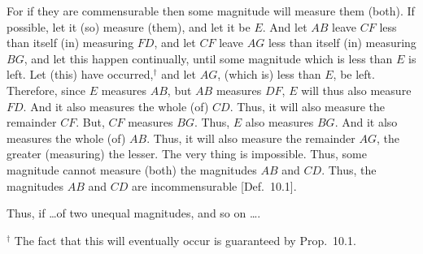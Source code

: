 \begin{Parallel}{}{}
{For if they are commensurable then some magnitude will measure them (both). If possible, let it
(so) measure (them),  and let it be $E$. And let $AB$ leave $CF$
less than itself (in) measuring $FD$, and let $CF$ leave $AG$ less than
itself (in) measuring $BG$, and let this happen continually, until  some magnitude which is less than  $E$ is left. Let (this) have occurred,$^\dag$ and
let $AG$, (which is) less than $E$, be left. Therefore, since
$E$ measures $AB$, but $AB$ measures $DF$, $E$ will thus also measure $FD$. And it also measures the whole (of) $CD$. Thus, it will
also measure the remainder  $CF$. But, $CF$ measures $BG$. Thus,
$E$ also measures $BG$. And it also measures the whole (of) $AB$. 
Thus, it will also measure the remainder $AG$, the greater (measuring)
the lesser. The very thing is impossible. Thus, some magnitude cannot
measure (both) the magnitudes $AB$ and $CD$. Thus, the
magnitudes $AB$ and $CD$ are incommensurable [Def.~10.1].

Thus, if \ldots of two unequal magnitudes, and so on \ldots.}
\end{Parallel}
{\footnotesize\noindent$^\dag$ The fact that this will eventually occur is guaranteed by
Prop.~10.1.}

